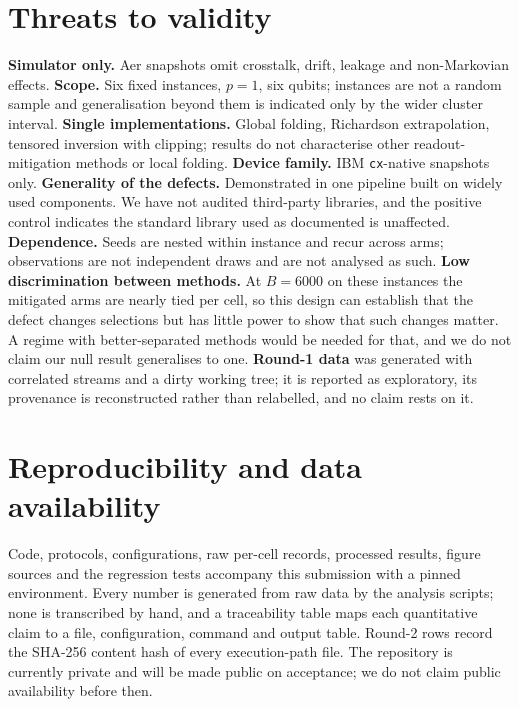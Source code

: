 \documentclass[10pt,conference]{IEEEtran}
\newcommand{\code}[1]{\texttt{\small #1}}
\begin{document}
\section{Threats to validity}\label{sec:threats}
\textbf{Simulator only.} Aer snapshots omit crosstalk, drift, leakage and non-Markovian effects.
\textbf{Scope.} Six fixed instances, $p=1$, six qubits; instances are not a random sample and
generalisation beyond them is indicated only by the wider cluster interval.
\textbf{Single implementations.} Global folding, Richardson extrapolation, tensored inversion with
clipping; results do not characterise other readout-mitigation methods or local folding.
\textbf{Device family.} IBM \code{cx}-native snapshots only.
\textbf{Generality of the defects.} Demonstrated in one pipeline built on widely used components.
We have not audited third-party libraries, and the positive control indicates the standard library
used as documented is unaffected.
\textbf{Dependence.} Seeds are nested within instance and recur across arms; observations are not
independent draws and are not analysed as such.
\textbf{Low discrimination between methods.} At $B=6000$ on these instances the mitigated arms are
nearly tied per cell, so this design can establish that the defect changes selections but has little
power to show that such changes matter. A regime with better-separated methods would be needed for
that, and we do not claim our null result generalises to one.
\textbf{Round-1 data} was generated with correlated streams and a dirty working tree; it is reported
as exploratory, its provenance is reconstructed rather than relabelled, and no claim rests on it.

\section{Reproducibility and data availability}\label{sec:repro}
Code, protocols, configurations, raw per-cell records, processed results, figure sources and the
regression tests accompany this submission with a pinned environment. Every number is generated from
raw data by the analysis scripts; none is transcribed by hand, and a traceability table maps each
quantitative claim to a file, configuration, command and output table. Round-2 rows record the
SHA-256 content hash of every execution-path file. The repository is currently private and will be
made public on acceptance; we do not claim public availability before then.
\end{document}
